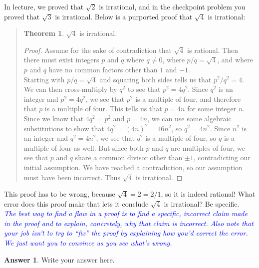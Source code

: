 \documentclass{article}
\renewcommand{\(}{\left(}
\renewcommand{\)}{\right)}
\theoremstyle{plain}
\theoremstyle{plain}
\theoremstyle{definition}
\newtheorem*{answer}{Answer}
\newtheorem*{thm}{Theorem}
\begin{document}
In lecture,
we proved that $\sqrt{2}$ is irrational,
and in the checkpoint problem you proved that $\sqrt{3}$
is irrational.
Below is a purported proof that $\sqrt{4}$ is irrational:
\vspace{-2em}
\begin{quote}
\begin{thm}
$\sqrt{4}$ is irrational.
\end{thm}
\begin{proof}
Assume for the sake of contradiction that $\sqrt{4}$ is rational.
Then there must exist integers $p$ and $q$ where $q \neq 0$,
where $p/q = \sqrt{4}$,
and where $p$ and $q$ have no common factors other than $1$ and $-1$. \\

Starting with $p/q = \sqrt{4}$ and squaring both sides tells us that
$p^2 / q^2 = 4$.
We can then cross-multiply by $q^2$ to see that $p^2 = 4q^2$.
Since $q^2$ is an integer and $p^2 = 4q^2$,
we see that $p^2$ is a multiple of four,
and therefore that $p$ is a multiple of four.
This tells us that $p = 4n$ for some integer $n$. \\

Since we know that $4q^2 = p^2$ and $p = 4n$,
we can use some algebraic substitutions to show that
$4q^2 = (4n)^2 = 16n^2$,
so $q^2 = 4n^2$.
Since $n^2$ is an integer and $q^2 = 4n^2$,
we see that $q^2$ is a multiple of four,
so $q$ is a multiple of four as well.
But since both $p$ and $q$ are multiples of four,
we see that $p$ and $q$ share a common divisor other than $\pm 1$,
contradicting our initial assumption.
We have reached a contradiction,
so our assumption must have been incorrect.
Thus $\sqrt{4}$ is irrational.
\end{proof}
\end{quote}
This proof has to be wrong,
because $\sqrt{4} = 2 = 2/1$,
so it is indeed rational! What error does this proof make that lets it conclude $\sqrt{4}$
is irrational? Be specific. \\

\textit{\textcolor{blue}{ The best way to find a flaw in a proof is to find a specific, incorrect claim made in the proof and to explain, concretely, why that claim is incorrect. Also note that your job isn't to try to ``fix'' the proof by explaining
how you'd correct the error. We just want you to convince us you see what's wrong. }}

\begin{shaded}
\begin{answer}
Write your answer here.
\end{answer}
\end{shaded}
\end{document}
